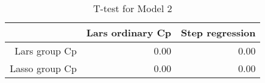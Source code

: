 \begin{table}[ht]
\centering
\begin{tabular}{rrr}
  \hline
 & Lars ordinary Cp & Step regression \\ 
  \hline
Lars group Cp & 0.00 & 0.00 \\ 
  Lasso group Cp & 0.00 & 0.00 \\ 
   \hline
\end{tabular}
\caption{T-test for Model 2} 
\end{table}
